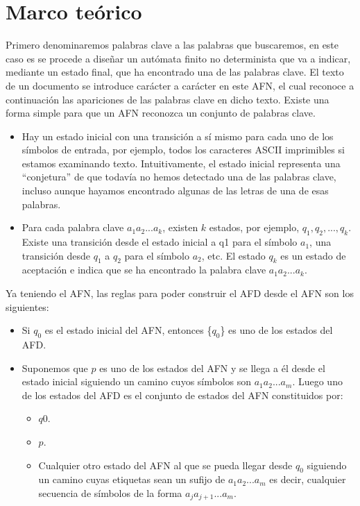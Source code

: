 \documentclass{article}
\begin{document}
\section{Marco teórico}

Primero denominaremos palabras clave a las palabras que buscaremos, en este caso es se procede a diseñar un autómata finito no determinista que va a indicar, mediante un estado final, que ha encontrado una de las palabras clave. El texto de un documento se introduce carácter a carácter en este AFN, el cual reconoce a continuación las apariciones de las palabras clave en dicho texto. Existe una forma simple para que un AFN reconozca un conjunto de palabras clave.
\begin{itemize}
    \item Hay un estado inicial con una transición a sí mismo para cada uno de los símbolos de entrada, por ejemplo, todos los caracteres ASCII imprimibles si estamos examinando texto. Intuitivamente, el estado inicial representa una “conjetura” de que todavía no hemos detectado una de las palabras clave, incluso aunque hayamos encontrado algunas de las letras de una de esas palabras.
    \item Para cada palabra clave $a_1a_2...a_k$, existen $k$ estados, por ejemplo, $q_1, q_2, ..., q_k$. Existe una transición desde el estado inicial a q1 para el símbolo $a_1$, una transición desde $q_1$ a $q_2$ para el símbolo $a_2$, etc. El estado $q_k$ es un estado de aceptación e indica que se ha encontrado la palabra clave $a_1a_2...a_k$.
\end{itemize}
Ya teniendo el AFN, las reglas para poder construir el AFD desde el AFN son los siguientes:
\begin{itemize}
    \item Si $q_0$ es el estado inicial del AFN, entonces \{$q_0$\} es uno de los estados del AFD.
    \item Suponemos que $p$ es uno de los estados del AFN y se llega a él desde el estado inicial siguiendo un camino cuyos símbolos son $a_1a_2...a_m$. Luego uno de los estados del AFD es el conjunto de estados del AFN constituidos por:
    \begin{itemize}
        \item $q0$.
        \item $p$.
        \item Cualquier otro estado del AFN al que se pueda llegar desde $q_0$ siguiendo un camino cuyas etiquetas sean un sufijo de $a_1a_2...a_m$ es decir, cualquier secuencia de símbolos de la forma $a_ja_{j+1}...a_m$.
    \end{itemize}
\end{itemize}
\end{document}
